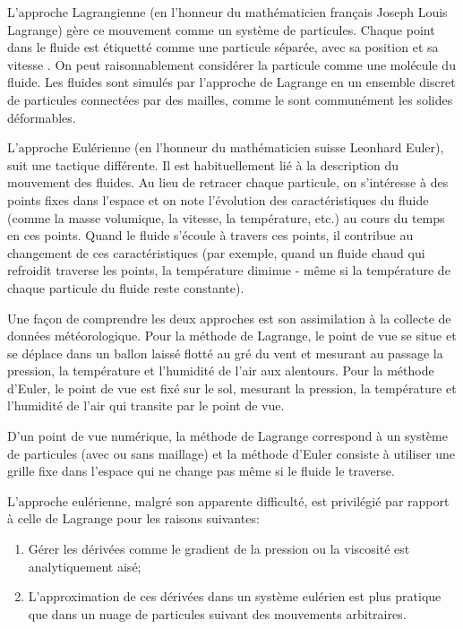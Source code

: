 \documentclass[11pt]{report}
\begin{document}
L'approche Lagrangienne (en l'honneur du mathématicien français Joseph Louis Lagrange) gère ce mouvement comme un système de particules. Chaque point dans le fluide est étiquetté comme une particule séparée, avec sa position  et sa vitesse . On peut raisonnablement considérer la particule comme une molécule du fluide. Les fluides sont simulés par l'approche de Lagrange en un ensemble discret de particules connectées par des mailles, comme le sont communément les solides déformables.\newline

L'approche Eulérienne (en l'honneur du mathématicien suisse Leonhard Euler), suit une tactique différente. Il est habituellement lié à la description du mouvement des fluides. Au lieu de retracer chaque particule, on s'intéresse à des points fixes dans l'espace et on note l'évolution des caractéristiques du fluide (comme la masse volumique, la vitesse, la température, etc.) au cours du temps en ces points. Quand le fluide s'écoule à travers ces points, il contribue au changement de ces caractéristiques (par exemple, quand un fluide chaud qui refroidit traverse les points, la température diminue - même si la température de chaque particule du fluide reste constante). \newline

Une façon de comprendre les deux approches est son assimilation à la collecte de données météorologique. Pour la méthode de Lagrange, le point de vue se situe et se déplace dans un ballon laissé flotté au gré du vent et mesurant au passage la pression, la température et l'humidité de l'air aux alentours. Pour la méthode d'Euler, le point de vue est fixé sur le sol, mesurant la pression, la température et l'humidité de l'air qui transite par le point de vue. \newline

D'un point de vue numérique, la méthode de Lagrange correspond à un système de particules (avec ou sans maillage) et la méthode d'Euler consiste à utiliser une grille fixe dans l'espace qui ne change pas même si le fluide le traverse. \newline

L'approche eulérienne, malgré son apparente difficulté, est privilégié par rapport à celle de Lagrange pour les raisons suivantes:

\begin{enumerate}
\item Gérer les dérivées comme le gradient de la pression ou la viscosité est analytiquement aisé; 
\item L'approximation de ces dérivées dans un système eulérien est plus pratique que dans un nuage de particules suivant des mouvements arbitraires.\newline
\end{enumerate}
\end{document}
